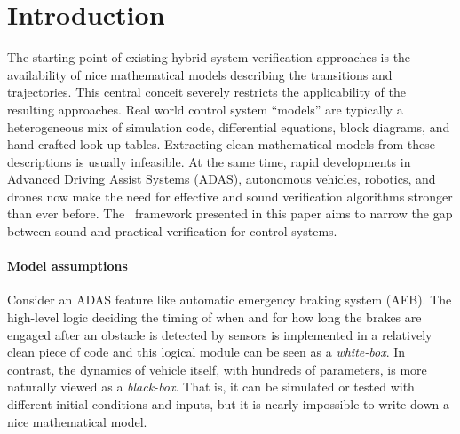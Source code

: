 
\section{Introduction}
\label{sec:intro}

The starting point of existing hybrid system verification approaches
is the availability of nice mathematical models describing the
transitions and trajectories. This central conceit severely restricts
the applicability of the resulting approaches. Real world control
system ``models'' are typically a heterogeneous mix of simulation
code, differential equations, block diagrams, and hand-crafted look-up
tables. Extracting clean mathematical models from these descriptions
is usually infeasible.
%
At the same time, rapid developments in Advanced Driving Assist Systems (ADAS), autonomous vehicles, robotics, and drones now make the need  for effective and sound verification algorithms stronger than ever before. 
%
The \toolname\ framework  presented in this paper aims to narrow the gap between sound  and practical verification for control systems.
\vspace{-10pt}
\paragraph{Model assumptions}
 Consider an ADAS feature like automatic emergency braking system (AEB). The high-level logic deciding the timing of when and for how long the brakes are engaged after an obstacle is detected by sensors is implemented in a relatively clean piece of code and this logical module can be seen as a {\em white-box\/}. In contrast, the dynamics of vehicle itself, with  hundreds of parameters, is more naturally viewed as a {\em black-box\/}. That is, it can be simulated or tested with different initial conditions and  inputs, but it is nearly impossible to write down a nice mathematical model.
 
